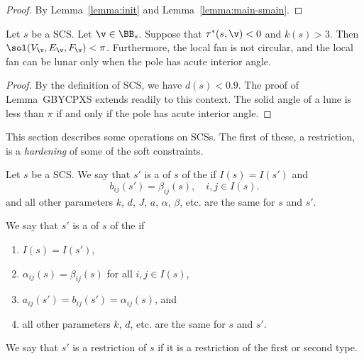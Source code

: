 \begin{proof} By Lemma~\ref{lemma:init} and Lemma~\ref{lemma:main-smain}.
\end{proof}

\begin{lemma}\label{lemma:not-circular}
Let $s$ be a SCS.  Let $\v\in \BB_s$.
Suppose that $\tau^*(s,\v)< 0$ and $k(s)>3$.  Then
$\sol(V_\v,E_\v,F_\v) < \pi$.
Furthermore, the local fan is not circular, and
the local fan can be lunar only when the pole has acute interior
angle.
\end{lemma}

\begin{proof} By the definition of SCS,
we have $d(s)< 0.9$. The proof of Lemma~GBYCPXS %
extends readily
to this context. The solid angle of a lune is less than $\pi$ if and only
if the pole has acute interior angle.
\end{proof}









This section describes some operations on SCSs.  
The first of these, a restriction,
 is a {\it hardening} of some of the soft constraints.


\begin{definition}[restriction]
Let $s$ be a SCS.
We say that $s'$ is a  of $s$ of the  if $I(s)=I(s')$ and
\[
b_{ij}(s') =  \beta_{ij}(s), \quad i,j\in I(s).
\]
and all other parameters $k$, $d$, $J$, $a$, $\alpha$, $\beta$, etc. are
the same for $s$ and $s'$.

We say that $s'$ is a  of $s$ of the  if 
\begin{enumerate}
\item $I(s)=I(s')$,
\item $\alpha_{ij}(s)=\beta_{ij}(s)$ for all $i,j\in I(s)$,
\item
$a_{ij}(s') = b_{ij}(s') = \alpha_{i j} (s)$,
and 
\item all other parameters $k$, $d$, etc.
are
the same for $s$ and $s'$.
\end{enumerate}
We say that $s'$ is a restriction of $s$ if it is a restriction of
the first or second type.
\end{definition}


